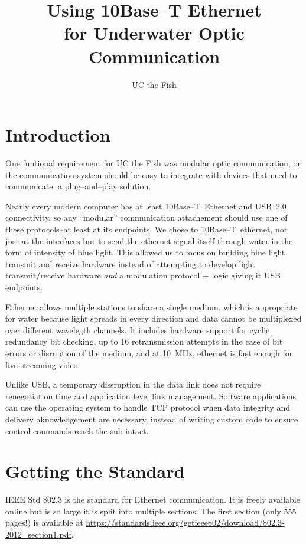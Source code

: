 \documentclass{article}
\begin{document}
\title{Using 10Base--T Ethernet\\for Underwater Optic Communication}
\author{UC the Fish}

\maketitle

\section{Introduction}

One funtional requirement for UC the Fish was modular optic communication,
or the communication system should be easy to integrate with devices that need to
communicate; a plug--and--play solution.

Nearly every modern computer has at least \mbox{10Base--T Ethernet} and
\mbox{USB 2.0} connectivity, so any ``modular'' communication attachement
should use one of these protocols--at least at its endpoints.
We chose to \mbox{10Base--T ethernet}, not just at the interfaces but to
send the ethernet signal itself through water in the form of intensity
of blue light.
This allowed us to focus on building blue light transmit and receive
hardware instead of attempting to develop light transmit/receive hardware
\textit{and} a modulation protocol + logic giving it USB endpoints.

Ethernet allows multiple stations to share a single medium,
which is appropriate for water because light spreads in every direction
and data cannot be multiplexed over different wavelegth channels. 
It includes hardware support for cyclic redundancy bit checking,
up to 16 retransmission attempts in the case of bit errors or disruption
of the medium, and at \mbox{10 MHz}, ethernet is fast enough 
for live streaming video.

Unlike USB, a temporary dissruption in the data link does not require
renegotiation time and application level link management.
Software applications can use the operating system to handle TCP protocol
when data integrity and delivery aknowledgement are necessary, instead
of writing custom code to ensure control commands reach the sub intact.

\section{Getting the Standard}

IEEE Std 802.3 is the standard for Ethernet communication.
It is freely available online but is so large it is split into multiple
sections.
The first section (only 555 pages!) is available at
\url{https://standards.ieee.org/getieee802/download/802.3-2012\_section1.pdf}.
\end{document}
